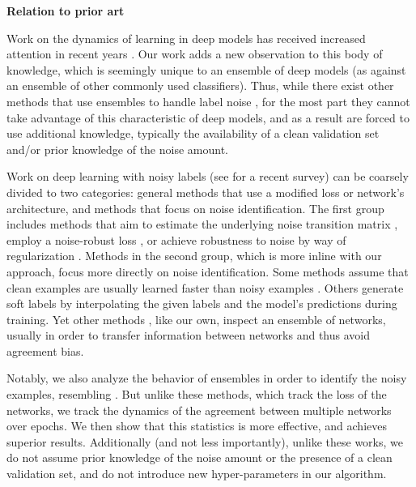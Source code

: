 \documentclass{article}
\newcommand{\myparagpar}[1]{\noindent\textbf{#1}}
\begin{document}
\myparagpar{Relation to prior art}

Work on the dynamics of learning in deep models has received increased attention in recent years \citep[e.g.,][]{nguyen2020wide,hacohen2020let,baldock2021deep}. Our work adds a new observation to this body of knowledge, which is seemingly unique to an ensemble of deep models (as against an ensemble of other commonly used classifiers). Thus, while there exist other methods that use ensembles to handle label noise  \citep[e.g.,][]{SABZEVARI20182374,Feng2020Adaptive,Ying21Destect,Moura18Ensemble}, for the most part they cannot take advantage of this characteristic of deep models, and as a result are forced to use additional knowledge, typically the availability of a clean validation set and/or prior knowledge of the noise amount. 

Work on deep learning with noisy labels (see \cite{song2022learning} for a recent survey) can be coarsely divided to two categories: general methods that use a modified loss or network's architecture, and methods that focus on noise identification. The first group includes methods that aim to estimate the underlying noise transition matrix \citep{goldberger2016training,patrini2017making}, employ a noise-robust loss \citep{ghosh2017robust,zhang2018generalized,wang2019symmetric,xu2019l_dmi}, or achieve robustness to noise by way of regularization \citep{tanno2019learning,jenni2018deep}. Methods in the second group, which is more inline with our approach, focus more directly on noise identification. Some methods assume that clean examples are usually learned faster than noisy examples \citep[e.g.][]{liu2020early}. Others \citep{arazo2019unsupervised,li2020dividemix} generate soft labels by interpolating the given labels and the model's predictions during training. Yet other methods \citep{jiang2018mentornet,han2018co,malach2017decoupling,yu2019does,lec}, like our own, inspect an ensemble of networks, usually in order to transfer information between networks and thus avoid agreement bias. 

Notably, we also analyze the behavior of ensembles in order to identify the noisy examples, resembling \citep{pleiss2020identifying,nguyen2019self,lec}. But unlike these methods, which track the loss of the networks, we track the dynamics of the agreement between multiple networks over epochs. We then show that this statistics is more effective, and achieves superior results. Additionally (and not less importantly), unlike these works, we do not assume prior knowledge of the noise amount or the presence of a clean validation set, and do not introduce new hyper-parameters in our algorithm. 
\end{document}
